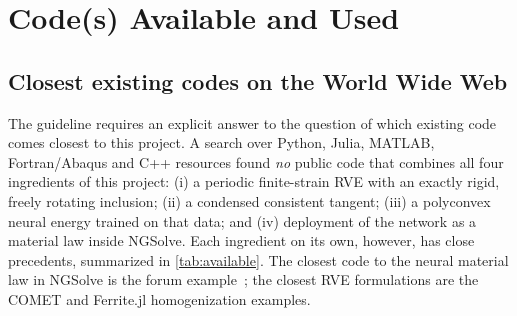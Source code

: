 \chapter{Code(s) Available and Used}\label{ch:codes}

\section{Closest existing codes on the World Wide Web}

The guideline requires an explicit answer to the question of which existing
code comes closest to this project. A search over Python, Julia, MATLAB,
Fortran/Abaqus and C++ resources found \emph{no} public code that combines all
four ingredients of this project: (i) a periodic finite-strain RVE with an
exactly rigid, freely rotating inclusion; (ii) a condensed consistent tangent;
(iii) a polyconvex neural energy trained on that data; and (iv) deployment of the
network as a material law inside NGSolve. Each ingredient on its own, however,
has close precedents, summarized in \cref{tab:available}. The closest code to the
neural material law in NGSolve is the forum example~\cite{NGSolveForumTF}; the
closest RVE formulations are the COMET and Ferrite.jl homogenization examples.

